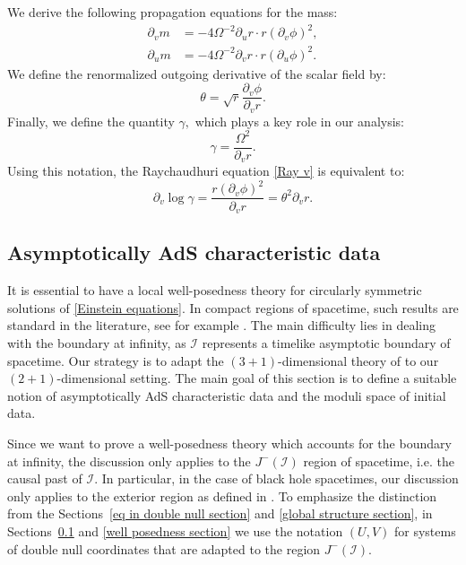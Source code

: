 \documentclass[11pt]{article}
\numberwithin{equation}{section}
\begin{document}
We derive the following propagation equations for the mass:
\begin{align}
    \partial_vm&=-4\Omega^{-2}\partial_ur\cdot r(\partial_v\phi)^2,\label{dv m} \\
    \partial_um&=-4\Omega^{-2}\partial_vr\cdot r(\partial_u\phi)^2.\label{du m}
\end{align}
We define the renormalized outgoing derivative of the scalar field by:
\begin{equation}\label{definition of theta}
    \theta=\sqrt{r}\frac{\partial_v\phi}{\partial_vr}.
\end{equation}
Finally, we define the quantity $\gamma,$ which plays a key role in our analysis:
\begin{equation}\label{definition of gamma}
    \gamma=\frac{\Omega^2}{\partial_vr}.
\end{equation}
Using this notation, the Raychaudhuri equation \eqref{Ray v} is equivalent to:
\begin{equation}\label{dv log gamma}
    \partial_v\log\gamma=\frac{r(\partial_v\phi)^2}{\partial_vr}=\theta^2\partial_vr.
\end{equation}

\subsection{Asymptotically AdS characteristic data}\label{asymptotic ads section}

It is essential to have a local well-posedness theory for circularly symmetric solutions of \eqref{Einstein equations}. In compact regions of spacetime, such results are standard in the literature, see for example \cite{BV,Dafermos_extension,kommemi}. The main difficulty lies in dealing with the boundary at infinity, as $\mathcal{I}$ represents a timelike asymptotic boundary of spacetime. Our strategy is to adapt the $(3+1)$-dimensional theory of \cite{localwellposed} to our $(2+1)$-dimensional setting. The main goal of this section is to define a suitable notion of asymptotically AdS characteristic data and the moduli space of initial data.

Since we want to prove a well-posedness theory which accounts for the boundary at infinity, the discussion only applies to the $J^-(\mathcal{I})$ region of spacetime, i.e. the causal past of $\mathcal{I}.$ In particular, in the case of black hole spacetimes, our discussion only applies to the exterior region as defined in . To emphasize the distinction from the Sections~\ref{eq in double null section} and \ref{global structure section}, in Sections~\ref{asymptotic ads section} and \ref{well posedness section} we use the notation $(U,V)$ for systems of double null coordinates that are adapted to the region $J^-(\mathcal{I})$.
\end{document}
